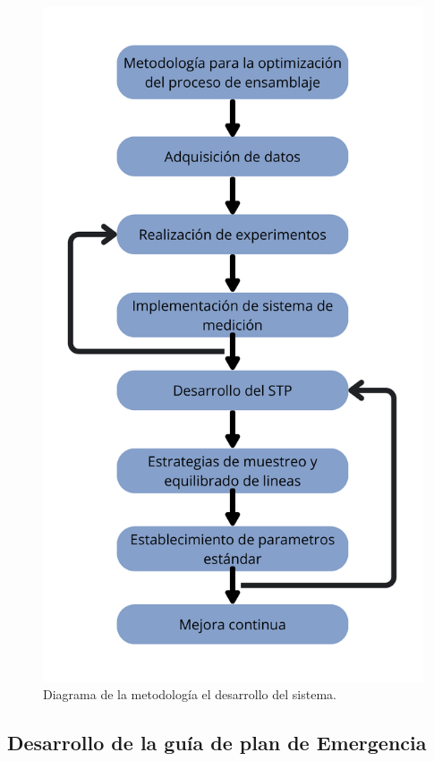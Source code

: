     
    \begin{figure}[H]
        \centering
        \includegraphics[scale=0.181]{15/img/diagramaMetodologia.pdf}
        \caption{Diagrama de la metodología el desarrollo del sistema.}
        \label{fig:diagramaMetodologia}
    \end{figure}
    
    \subsection{Desarrollo de la guía de plan de Emergencia}
    
